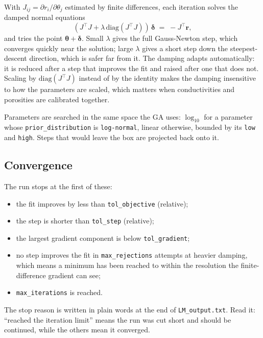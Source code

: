 \documentclass[11pt,a4paper]{article}
\newcommand{\code}[1]{\texttt{\small #1}}
\newcommand{\file}[1]{\texttt{\small #1}}
\begin{document}
With $J_{ij} = \partial r_i / \partial \theta_j$ estimated by finite
differences, each iteration solves the damped normal equations
\begin{equation}
  \left(J^{\!\top}\! J + \lambda\,\mathrm{diag}(J^{\!\top}\! J)\right)\,
  \boldsymbol{\delta} \;=\; -J^{\!\top}\mathbf{r},
\end{equation}
and tries the point $\boldsymbol{\theta} + \boldsymbol{\delta}$. Small $\lambda$
gives the full Gauss-Newton step, which converges quickly near the solution;
large $\lambda$ gives a short step down the steepest-descent direction, which is
safer far from it. The damping adapts automatically: it is reduced after a step
that improves the fit and raised after one that does not. Scaling by
$\mathrm{diag}(J^{\!\top}\! J)$ instead of by the identity makes the damping
insensitive to how the parameters are scaled, which matters when conductivities
and porosities are calibrated together.

Parameters are searched in the same space the GA uses: $\log_{10}$ for a
parameter whose \code{prior\_distribution} is \code{log-normal}, linear
otherwise, bounded by its \code{low} and \code{high}. Steps that would leave the
box are projected back onto it.

\subsection{Convergence}

The run stops at the first of these:

\begin{itemize}[leftmargin=1.4em]
  \item the fit improves by less than \code{tol\_objective} (relative);
  \item the step is shorter than \code{tol\_step} (relative);
  \item the largest gradient component is below \code{tol\_gradient};
  \item no step improves the fit in \code{max\_rejections} attempts at heavier
        damping, which means a minimum has been reached to within the
        resolution the finite-difference gradient can see;
  \item \code{max\_iterations} is reached.
\end{itemize}

The stop reason is written in plain words at the end of \file{LM\_output.txt}.
Read it: ``reached the iteration limit'' means the run was cut short and should
be continued, while the others mean it converged.
\end{document}
